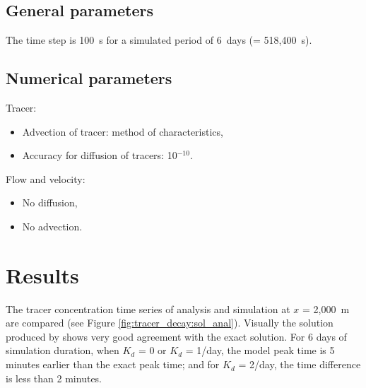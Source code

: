 \subsection{General parameters}

The time step is 100~s for a simulated period of 6~days (= 518,400~s).

\subsection{Numerical parameters}

Tracer:
\begin{itemize}
\item Advection of tracer: method of characteristics,
\item Accuracy for diffusion of tracers: 10$^{-10}$.
\end{itemize}

Flow and velocity:
\begin{itemize}
  \item No diffusion,
  \item No advection.
\end{itemize}

\section{Results}

The tracer concentration time series of analysis and simulation at $x$ = 2,000~m
are compared (see Figure \ref{fig:tracer_decay:sol_anal}).
Visually the solution produced by  shows very good
agreement with the exact solution.
For 6 days of simulation duration, when $K_d$ = 0 or $K_d$ = 1/day, the model
peak time is 5 minutes earlier than the exact peak time;
and for $K_d$ = 2/day, the time difference is less than 2 minutes.

